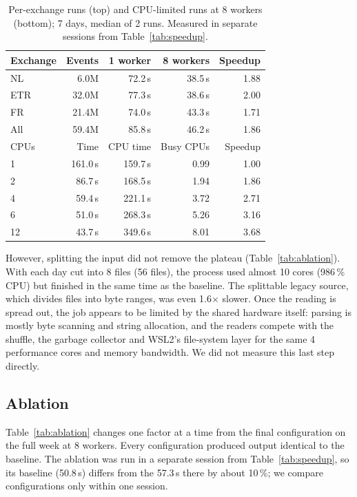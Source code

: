 \documentclass[sigconf,nonacm]{acmart}
\begin{document}
\begin{table}[t]
\caption{Per-exchange runs (top) and CPU-limited runs at 8 workers (bottom);
7 days, median of 2 runs. Measured in separate sessions from
Table~\ref{tab:speedup}.}\label{tab:exchcpu}
\begin{tabular}{lrrrr}
\toprule
Exchange & Events & 1 worker & 8 workers & Speedup \\
\midrule
NL  &  6.0M & 72.2\,s & 38.5\,s & 1.88 \\
ETR & 32.0M & 77.3\,s & 38.6\,s & 2.00 \\
FR  & 21.4M & 74.0\,s & 43.3\,s & 1.71 \\
All & 59.4M & 85.8\,s & 46.2\,s & 1.86 \\
\midrule
CPUs & Time & CPU time & Busy CPUs & Speedup \\
\midrule
1  & 161.0\,s & 159.7\,s & 0.99 & 1.00 \\
2  &  86.7\,s & 168.5\,s & 1.94 & 1.86 \\
4  &  59.4\,s & 221.1\,s & 3.72 & 2.71 \\
6  &  51.0\,s & 268.3\,s & 5.26 & 3.16 \\
12 &  43.7\,s & 349.6\,s & 8.01 & 3.68 \\
\bottomrule
\end{tabular}
\end{table}

However, splitting the input did not remove the plateau
(Table~\ref{tab:ablation}). With each day cut into 8 files (56 files), the
process used almost 10 cores (986\,\% CPU) but finished in the same time as
the baseline. The splittable legacy source, which divides files into byte
ranges, was even 1.6$\times$ slower. Once the reading is spread out, the job
appears to be limited by the shared hardware itself: parsing is mostly byte
scanning and string allocation, and the readers compete with the shuffle, the
garbage collector and WSL2's file-system layer for the same 4 performance cores
and memory bandwidth. We did not measure this last step directly.

\subsection{Ablation}\label{sec:ablation}
Table~\ref{tab:ablation} changes one factor at a time from the final
configuration on the full week at 8 workers. Every configuration produced
output identical to the baseline. The ablation was run in a separate session from
Table~\ref{tab:speedup}, so its baseline (50.8\,s) differs from the 57.3\,s
there by about 10\,\%; we compare configurations only within one session.
\end{document}
